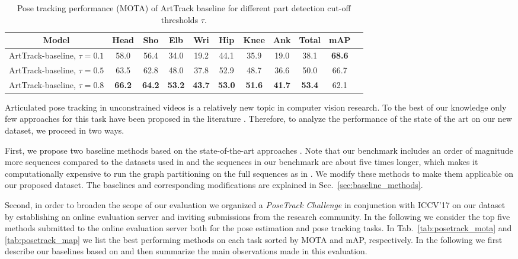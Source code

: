 \documentclass[10pt,twocolumn,letterpaper]{article}
\begin{document}
 \tabcolsep 1.5pt
\begin{table}[bp]
 \scriptsize
  \centering
  \begin{tabular}{@{} c c ccc ccc c | c c@{}}
    \toprule
    Model& Head   & Sho  & Elb & Wri & Hip & Knee & Ank & Total & mAP \\
\midrule
     ArtTrack-baseline, $\tau=0.1$    & 58.0 & 56.4 & 34.0 & 19.2 & 44.1 & 35.9 & 19.0 & 38.1 & \textbf{68.6} \\ 
     ArtTrack-baseline, $\tau=0.5$    & 63.5 & 62.8 & 48.0 & 37.8 & 52.9 & 48.7 & 36.6 & 50.0 & 66.7 \\ 
     ArtTrack-baseline, $\tau=0.8$    & \textbf{66.2} & \textbf{64.2} & \textbf{53.2} & \textbf{43.7} & \textbf{53.0} & \textbf{51.6} & \textbf{41.7} & \textbf{53.4} & 62.1 \\ 
\bottomrule
  \end{tabular}
\caption[]{Pose tracking performance (MOTA) of ArtTrack baseline for different
  part detection cut-off thresholds $\tau$. 
}
\label{tab:tracking-mota-val}
\end{table}
 
Articulated pose tracking in unconstrained videos is a relatively new topic in
computer vision research. To the best of our knowledge only few approaches for
this task have been proposed in the literature \cite{insafutdinov17cvpr,Iqbal:2017:CVPR}.
Therefore, to analyze the performance of the state of the art on our
new dataset, we proceed in two ways. 

First, we propose two baseline methods based on the state-of-the-art approaches \cite{insafutdinov17cvpr,Iqbal:2017:CVPR}. Note that our benchmark includes an order of magnitude more
sequences compared to the datasets used in
\cite{insafutdinov17cvpr,Iqbal:2017:CVPR} and the sequences in our benchmark are about
five times longer, which makes it computationally expensive to run the
graph partitioning on the full sequences as in
\cite{insafutdinov17cvpr, Iqbal:2017:CVPR}. We modify these methods to make them applicable on our proposed dataset. The baselines and corresponding modifications are explained in Sec.~\ref{sec:baseline_methods}.

Second, in order to broaden the scope of our evaluation we organized a  \emph{PoseTrack Challenge} in conjunction with ICCV'17 on our dataset by establishing an online evaluation
server and inviting submissions from the research community. 
In the following we consider the top five methods submitted to the online
evaluation server both for the pose estimation and pose tracking
tasks. In Tab.~\ref{tab:posetrack_mota} and \ref{tab:posetrack_map} we
list the best performing methods on each task sorted by MOTA and mAP,
respectively.  In the following we first describe our baselines based
on \cite{insafutdinov17cvpr,Iqbal:2017:CVPR} and then summarize the
main observations made in this evaluation.
\end{document}
